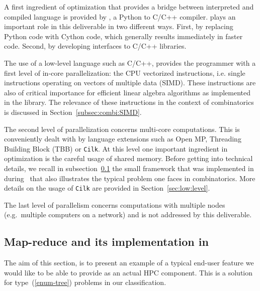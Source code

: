 \documentclass{deliverablereport}
\newcommand{\Cilk}{\texttt{Cilk}\xspace}
\begin{document}
A first ingredient of optimization that provides a bridge between interpreted
and compiled language is provided by \Cython, a Python
to C/C++ compiler. \Cython plays an important role in this deliverable in two
different ways. First, by replacing Python code with Cython code, which generally results
immediately in faster code. Second, by developing interfaces to C/C++ libraries.

The use of a low-level language such as C/C++, provides the programmer with a
first level of in-core
parallelization: the CPU vectorized
instructions, i.e. single instructions operating on vectors of multiple
data (SIMD). These instructions are also of critical importance for efficient
linear algebra algorithms as implemented in the \Linbox library. The relevance
of these instructions in the context of combinatorics is discussed in
Section~\ref{subsec:combi:SIMD}. 

The second level of parallelization concerns multi-core computations. This is
conveniently dealt with by language extensions such as Open MP, Threading 
Building Block (TBB) or \Cilk. At this level one important ingredient in
optimization is the careful usage of shared memory.  Before getting into
technical details, we recall in subsection~\ref{subsec:map-reduce:Sage} the
small framework that was implemented in \Sage
during~ that also illustrates the typical
problem one faces in combinatorics. More details on the usage of \Cilk are
provided in Section~\ref{sec:low:level}.

The last level of parallelism concerns computations with multiple nodes
(e.g.~multiple computers on a network) and is not addressed by this
deliverable.

\subsection{Map-reduce and its implementation in \Sage}
\label{subsec:map-reduce:Sage}

The aim of this section, is to present an example of a typical end-user feature we would like
to be able to provide as an actual HPC component. This is a solution for
type~(\ref{enum-tree}) problems in our classification.
\end{document}
